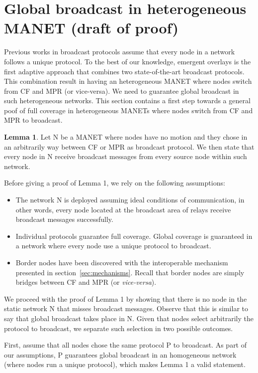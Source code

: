 \newpage

\section{Global broadcast in heterogeneous MANET (draft of proof)}

Previous works in broadcast protocols assume that every node in a network follows a unique protocol.
To the best of our knowledge, emergent overlays is the first adaptive approach that combines two state-of-the-art broadcast protocols.
This combination result in having an heterogeneous MANET where nodes switch from CF and MPR (or vice-versa).
We need to guarantee global broadcast in such heterogeneous networks.
This section contains a first step towards a general poof of full coverage in heterogeneous MANETs where nodes switch from CF and MPR to broadcast.

\textbf{Lemma 1}. Let N be a MANET where nodes have no motion and they chose in an arbitrarily way between CF or MPR as broadcast protocol. We then state that every node in N receive broadcast messages from every source node within such network.


Before giving a proof of Lemma 1, we rely on the following assumptions:

\begin{itemize}
	\item The network N is deployed assuming ideal conditions of communication, in other words, every node located at the broadcast area of relays receive broadcast messages successfully.
	\item Individual protocols guarantee full coverage. Global coverage is guaranteed in a network where every node use a unique protocol to broadcast.
	\item Border nodes have been discovered with the interoperable mechanism presented in section~\ref{sec:mechanisms}. Recall that border nodes are simply bridges between CF and MPR (or \emph{vice-versa}).
\end{itemize}

We proceed with the proof of Lemma 1 by showing that there is no node in the static network N that misses broadcast messages. Observe that this is similar to say that global broadcast takes place in N.
Given that nodes select arbitrarily the protocol to broadcast, we separate such selection in two possible outcomes.

First, assume that all nodes chose the same protocol P to broadcast.
As part of our assumptions, P guarantees global broadcast in an homogeneous network (where nodes run a unique protocol), which makes Lemma 1 a valid statement.

